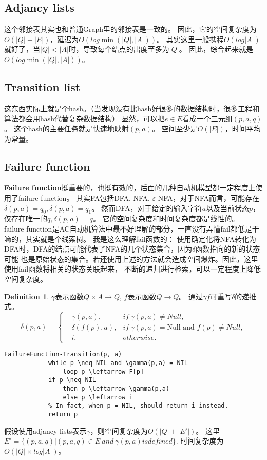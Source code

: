 \documentclass[UTF8]{ctexart}
\theoremstyle{definition}
\newtheorem{defn}[thm]{Definition}
\theoremstyle{remark}
\numberwithin{equation}{subsection}
\newcommand\Emph{\textbf}
\begin{document}
\subsection{Adjancy lists}
	
	这个邻接表其实也和普通Graph里的邻接表是一致的。
	因此，它的空间复杂度为$O(|Q| + |E|)$，延迟为$O(log \min(|Q|, |A|))$。
	其实这里一般携程$O(log |A|)$就好了，当$|Q|<|A|$时，导致每个结点的出度至多为$|Q|$。
	因此，综合起来就是$O(log \min(|Q|, |A|))$。
	
\subsection{Transition list}
	
	这东西实际上就是个hash。（当发现没有比hash好很多的数据结构时，很多工程和算法都会用hash代替复杂数据结构）
	显然，可以把$e \in E$看成一个三元组$(p, a, q)$。
	这个hash的主要任务就是快速地映射$(p,a)$。
	空间至少是$O(|E|)$，时间平均为常量。
	
\subsection{Failure function}
	
	\Emph{Failure function}挺重要的，也挺有效的，后面的几种自动机模型都一定程度上使用了failure function。
	其实FA包括DFA, NFA, $\varepsilon$-NFA，对于NFA而言，可能存在$\delta(p,a)=q_0, \delta(p,a)=q_1$。
	然而DFA，对于给定的输入字符$a$以及当前状态$p$，仅存在唯一的$q, \delta(p,a)=q$。
	它的空间复杂度和时间复杂度都是线性的。	\\
	
	failure function是AC自动机算法中最不好理解的部分，一直没有弄懂fail都低是干嘛的，其实就是个线索树。
	我是这么理解fail函数的：
	使用确定化将NFA转化为DFA时，DFA的结点可能代表了NFA的几个状态集合，因为$\delta$函数指向的新的状态可能
	也是原始状态的集合。若还使用上述的方法就会造成空间爆炸。因此，这里使用fail函数将相关的状态关联起来，
	不断的递归进行检索，可以一定程度上降低空间复杂度。
	
	\begin{defn}
		$\gamma$表示函数$Q \times A \rightarrow Q$, $f$表示函数$Q \rightarrow Q$。
		通过$\gamma f$可重写$\delta$的递推式。
		\[
			\delta(p,a) =
			\left\{
			\begin{aligned}
				&\gamma(p, a), 		&if\ \gamma(p, a) \neq Null,	              \\
				&\delta(f(p), a), 	&if\ \gamma(p, a) = \text{Null and } f(p) \neq Null,	\\
				&i,					&otherwise.
			\end{aligned}
			\right .
		\]
	\end{defn}
	\begin{lstlisting}[frame=shadowbox,framexleftmargin=5mm,rulesepcolor=\color{gray},numbers=none]
		FailureFunction-Transition(p, a)
			while p \neq NIL and \gamma(p,a) = NIL
				loop p \leftarrow F[p]
			if p \neq NIL
				then p \leftarrow \gamma(p,a)
				else p \leftarrow i
			% In fact, when p = NIL, should return i instead.
			return p	
	\end{lstlisting}
	假设使用adjancy lists表示$\gamma$，则空间复杂度为$O(|Q| + |E'|)$。
	这里$E' = \{(p,a,q) | (p,a,q) \in E \ and\ \gamma(p,a) is defined \}$.
	时间复杂度为$O(|Q| \times log |A|)$。
	
\end{document}
